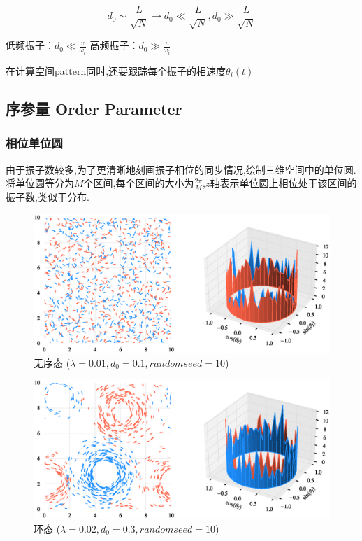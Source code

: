 \documentclass{article}
\begin{document}
$$
d_0\sim \frac{L}{\sqrt{N}}\rightarrow d_0\ll \frac{L}{\sqrt{N}}, d_0\gg \frac{L}{\sqrt{N}}
$$

低频振子：$d_0\ll \frac{v}{\omega _i}$
高频振子：$d_0\gg \frac{v}{\omega _i}$

在计算空间pattern同时,还要跟踪每个振子的相速度$\dot{\theta}_i(t)$

\newpage
\subsection{序参量 Order Parameter}

\subsubsection{相位单位圆}

由于振子数较多,为了更清晰地刻画振子相位的同步情况,绘制三维空间中的单位圆. 将单位圆等分为$M$个区间,每个区间的大小为$\frac{2\pi}{M}$,$z$轴表示单位圆上相位处于该区间的振子数,类似于分布.

\begin{figure}[H]
	\centering
	\includegraphics[width=\textwidth]{./figs/CorrectCoupling_uniform_0.010_0.10.eps}
	\vspace{-1cm}
	\caption{无序态 ($\lambda=0.01, d_0=0.1, random seed=10$)}
	\label{fig:fig231.1}
\end{figure}

\begin{figure}[H]
	\centering
	\includegraphics[width=\textwidth]{./figs/CorrectCoupling_uniform_0.020_0.30.eps}
	\vspace{-1cm}
	\caption{环态 ($\lambda=0.02, d_0=0.3, random seed=10$)}
	\label{fig:fig231.2}
\end{figure}
\end{document}
